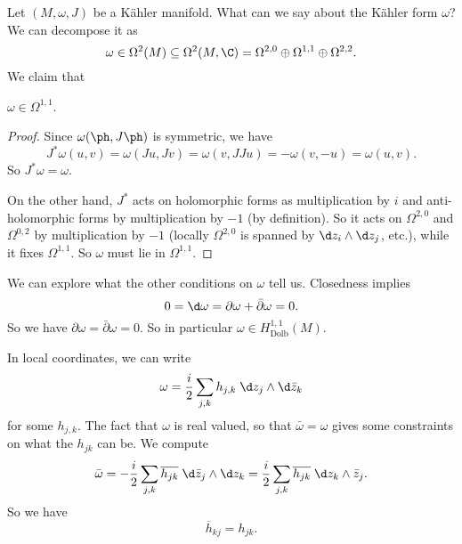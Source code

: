 \documentclass[a4paper]{article}
\newcommand\Dolb{\mathrm{Dolb}}
\begin{document}
Let $(M, \omega, J)$ be a K\"ahler manifold. What can we say about the K\"ahler form $\omega$? We can decompose it as
\[
  \omega \in \Omega^2(M) \subseteq \Omega^2(M, \C) = \Omega^{2, 0} \oplus \Omega^{1, 1} \oplus \Omega^{2, 2}.
\]
We claim that
\begin{lemma}
  $\omega \in \Omega^{1, 1}$.
\end{lemma}

\begin{proof}
  Since $\omega(\ph, J\ph)$ is symmetric, we have
  \[
    J^*\omega (u, v) = \omega(Ju, Jv) = \omega(v, JJu) = -\omega(v, -u) = \omega(u, v).
  \]
  So $J^* \omega = \omega$.

  On the other hand, $J^*$ acts on holomorphic forms as multiplication by $i$ and anti-holomorphic forms by multiplication by $-1$ (by definition). So it acts on $\Omega^{2, 0}$ and $\Omega^{0, 2}$ by multiplication by $-1$ (locally $\Omega^{2, 0}$ is spanned by $\d z_i \wedge \d z_j$, etc.), while it fixes $\Omega^{1, 1}$. So $\omega$ must lie in $\Omega^{1, 1}$.
\end{proof}

We can explore what the other conditions on $\omega$ tell us. Closedness implies
\[
  0 = \d \omega = \partial \omega + \bar{\partial} \omega = 0.
\]
So we have $\partial \omega = \bar{\partial} \omega = 0$. So in particular $\omega \in H^{1, 1}_{\Dolb}(M)$.

In local coordinates, we can write
\[
  \omega = \frac{i}{2} \sum_{j, k} h_{j, k} \;\d z_j \wedge \d \bar{z}_k
\]
for some $h_{j, k}$. The fact that $\omega$ is real valued, so that $\bar{\omega} = \omega$ gives some constraints on what the $h_{j k}$ can be. We compute
\[
  \bar{\omega} = -\frac{i}{2} \sum_{j, k}\overline{h_{jk}}\; \d \bar{z}_j \wedge \d z_k = \frac{i}{2} \sum_{j, k} \overline{h_{jk}} \;\d z_k \wedge \bar{z}_j.
\]
So we have
\[
  \overline{h}_{kj} = h_{jk}.
\]
\end{document}

